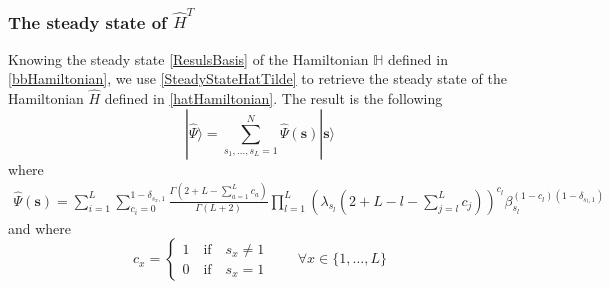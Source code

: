 \documentclass[11pt]{article}
\numberwithin{equation}{section}
\numberwithin{equation}{subsection}
\begin{document}
\subsubsection{The steady state of $\widehat{H}^{T}$}
Knowing the steady state \eqref{ResulsBasis} of the Hamiltonian $\mathbb{H}$ defined in \eqref{bbHamiltonian}, we use \eqref{SteadyStateHatTilde} to retrieve the steady state of the Hamiltonian $\widehat{H}$ defined in \eqref{hatHamiltonian}. The result is the following 
\begin{equation}\label{ABS-vect}
    |\widehat{\Psi}\rangle =\sum_{s_{1},\ldots,s_{L}=1}^{N}\widehat{\Psi}(\bm{s})|\bm{s}\rangle 
\end{equation}
where 
\begin{equation}\label{ABS}
		\begin{split}
			\widehat{\Psi}(\bm{s})=\sum_{i=1}^{L}\sum_{c_{i}=0}^{1-\delta_{s_{x},1}}\frac{\Gamma(2+L-\sum_{a=1}^{L}c_{a})}{\Gamma(L+2)}\prod_{l=1}^{L}\left(\lambda_{s_{l}}\left(2+L-l-\sum_{j=l}^{L}c_{j}\right)\right)^{c_{l}}\beta_{s_{l}}^{(1-c_{l})(1-\delta_{s_{l},1})}
		\end{split}
	\end{equation} 
and where
 \begin{equation}\label{CiEquation}
	c_{x}=\begin{cases}
		1\quad \text{if}\quad s_{x}\neq 1\\
		0\quad \text{if}\quad s_{x}=1
	\end{cases}\qquad \forall x\in \{1,\ldots,L\}
\end{equation}
\end{document}
